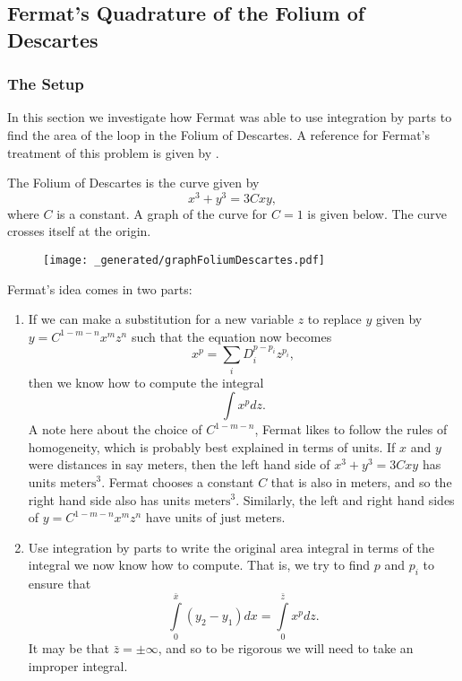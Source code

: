 \subsection{Fermat's Quadrature of the Folium of Descartes}

\subsubsection*{The Setup}

In this section we investigate how Fermat was able to use integration by parts to find the area of the
loop in the Folium of Descartes. A reference for Fermat's treatment of this problem is given by \cite{fermatTreatise}. 

The Folium of Descartes is the curve given by
\begin{equation}
x^3 + y^3 = 3C xy,
\end{equation}
where \(C\) is a constant. A graph of the curve for \(C = 1\) is given below. The curve crosses itself
at the origin.

\begin{figure}[h]
\centering
\texttt{[image: \_generated/graphFoliumDescartes.pdf]}
\end{figure}

Fermat's idea comes in two parts:
\begin{enumerate}
\item If we can make a substitution for a new variable \(z\) to replace \(y\) given by \(y = C^{1 - m - n} x^m z^n\) such that the equation
now becomes
\begin{equation}
x^p = \sum\limits_{i} D_i^{p - p_i} z^{p_i},
\end{equation}
then we know how to compute the integral
\begin{equation}
\int\limits x^p dz.
\end{equation}
A note here about the choice of \(C^{1 - m - n}\), Fermat likes to follow the rules of homogeneity, which is probably best explained
in terms of units. If \(x\) and \(y\) were distances in say meters, then the left hand side of \(x^3 + y^3 = 3Cxy\) has units 
\(\text{meters}^3\). Fermat chooses a constant \(C\) that is also in meters, and so the right hand side also has units
\(\text{meters}^3\). Similarly, the left and right hand sides of \(y = C^{1 - m -n} x^m z^n\) have units of just meters. 

\item Use integration by parts to write the original area integral in terms of the integral we now know how to compute. That is, 
we try to find \(p\) and \(p_i\) to ensure that
\begin{equation}
\int\limits_0^{\bar x} (y_2 - y_1) dx = \int\limits_0^{\bar z} x^p dz.
\end{equation}  
It may be that \(\bar z = \pm \infty\), and so to be rigorous we will need to take an improper integral.
\end{enumerate}

